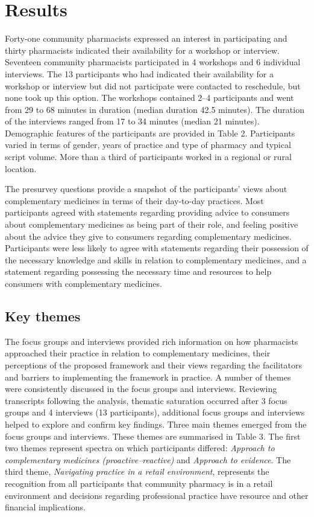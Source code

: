 \documentclass[12pt,]{article}
\begin{document}
\section{Results}\label{results}

Forty-one community pharmacists expressed an interest in participating
and thirty pharmacists indicated their availability for a workshop or
interview. Seventeen community pharmacists participated in 4 workshops
and 6 individual interviews. The 13 participants who had indicated their
availability for a workshop or interview but did not participate were
contacted to reschedule, but none took up this option. The workshops
contained 2--4 participants and went from 29 to 68 minutes in duration
(median duration 42.5 minutes). The duration of the interviews ranged
from 17 to 34 minutes (median 21 minutes). Demographic features of the
participants are provided in Table 2. Participants varied in terms of
gender, years of practice and type of pharmacy and typical script
volume. More than a third of participants worked in a regional or rural
location.



The presurvey questions provide a snapshot of the participants' views
about complementary medicines in terms of their day-to-day practices.
Most participants agreed with statements regarding providing advice to
consumers about complementary medicines as being part of their role, and
feeling positive about the advice they give to consumers regarding
complementary medicines. Participants were less likely to agree with
statements regarding their possession of the necessary knowledge and
skills in relation to complementary medicines, and a statement regarding
possessing the necessary time and resources to help consumers with
complementary medicines.

\subsection{Key themes}\label{key-themes}

The focus groups and interviews provided rich information on how
pharmacists approached their practice in relation to complementary
medicines, their perceptions of the proposed framework and their views
regarding the facilitators and barriers to implementing the framework in
practice. A number of themes were consistently discussed in the focus
groups and interviews. Reviewing transcripts following the analysis,
thematic saturation occurred after 3 focus groups and 4 interviews (13
participants), additional focus groups and interviews helped to explore
and confirm key findings. Three main themes emerged from the focus
groups and interviews. These themes are summarised in Table 3. The first
two themes represent spectra on which participants differed:
\emph{Approach to complementary medicines (proactive--reactive)} and
\emph{Approach to evidence}. The third theme, \emph{Navigating practice
in a retail environment}, represents the recognition from all
participants that community pharmacy is in a retail environment and
decisions regarding professional practice have resource and other
financial implications.
\end{document}
